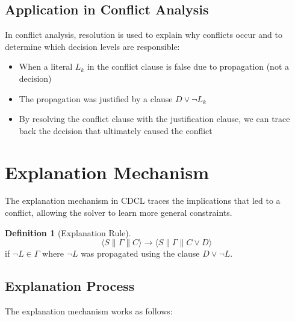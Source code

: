 \documentclass[11pt,a4paper]{article}
\theoremstyle{definition}
\newtheorem{definition}{Definition}[section]
\theoremstyle{plain}
\theoremstyle{remark}
\begin{document}
\subsection{Application in Conflict Analysis}

In conflict analysis, resolution is used to explain why conflicts occur and to determine which decision levels are responsible:

\begin{itemize}
    \item When a literal $L_k$ in the conflict clause is false due to propagation (not a decision)
    \item The propagation was justified by a clause $D \lor \neg L_k$
    \item By resolving the conflict clause with the justification clause, we can trace back the decision that ultimately caused the conflict
\end{itemize}

\section{Explanation Mechanism}

The explanation mechanism in CDCL traces the implications that led to a conflict, allowing the solver to learn more general constraints.

\begin{tcolorbox}[colback=orange!10!white,colframe=orange!75!black,title=\textbf{Explanation Transition}]
\begin{definition}[Explanation Rule]
\[
\langle S \parallel \varGamma \parallel C \rangle \rightarrow \langle S \parallel \varGamma \parallel C \lor D \rangle
\]
if $\neg L \in \varGamma$ where $\neg L$ was propagated using the clause $D \lor \neg L$.
\end{definition}
\end{tcolorbox}

\subsection{Explanation Process}

The explanation mechanism works as follows:
\end{document}
